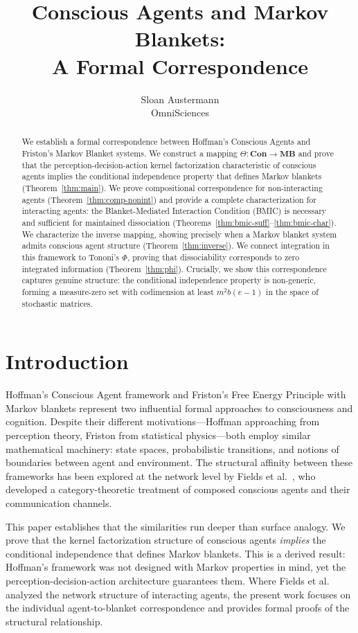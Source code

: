 \documentclass[11pt,a4paper]{article}
\title{Conscious Agents and Markov Blankets:\\A Formal Correspondence}
\author{Sloan Austermann\\
\small OmniSciences}
\date{}
\newcommand{\Con}{\mathbf{Con}}
\newcommand{\MB}{\mathbf{MB}}
\begin{document}
\maketitle

\begin{abstract}
We establish a formal correspondence between Hoffman's Conscious Agents and Friston's Markov Blanket systems. We construct a mapping $\Theta : \Con \to \MB$ and prove that the perception-decision-action kernel factorization characteristic of conscious agents implies the conditional independence property that defines Markov blankets (Theorem~\ref{thm:main}). We prove compositional correspondence for non-interacting agents (Theorem~\ref{thm:comp-nonint}) and provide a complete characterization for interacting agents: the Blanket-Mediated Interaction Condition (BMIC) is necessary and sufficient for maintained dissociation (Theorems~\ref{thm:bmic-suff}--\ref{thm:bmic-char}). We characterize the inverse mapping, showing precisely when a Markov blanket system admits conscious agent structure (Theorem~\ref{thm:inverse}). We connect integration in this framework to Tononi's $\Phi$, proving that dissociability corresponds to zero integrated information (Theorem~\ref{thm:phi}). Crucially, we show this correspondence captures genuine structure: the conditional independence property is non-generic, forming a measure-zero set with codimension at least $m^2 b(e-1)$ in the space of stochastic matrices.
\end{abstract}

\section{Introduction}

Hoffman's Conscious Agent framework \cite{hoffman2014,hoffman2019} and Friston's Free Energy Principle with Markov blankets \cite{friston2019} represent two influential formal approaches to consciousness and cognition. Despite their different motivations---Hoffman approaching from perception theory, Friston from statistical physics---both employ similar mathematical machinery: state spaces, probabilistic transitions, and notions of boundaries between agent and environment. The structural affinity between these frameworks has been explored at the network level by Fields et al.\ \cite{fields2018}, who developed a category-theoretic treatment of composed conscious agents and their communication channels.

This paper establishes that the similarities run deeper than surface analogy. We prove that the kernel factorization structure of conscious agents \emph{implies} the conditional independence that defines Markov blankets. This is a derived result: Hoffman's framework was not designed with Markov properties in mind, yet the perception-decision-action architecture guarantees them. Where Fields et al.\ \cite{fields2018} analyzed the network structure of interacting agents, the present work focuses on the individual agent-to-blanket correspondence and provides formal proofs of the structural relationship.
\end{document}

